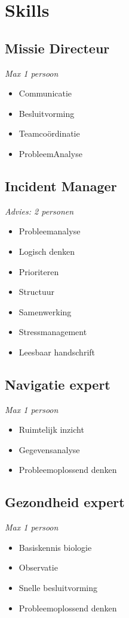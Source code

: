 \setcounter{page}{1}
\section{Skills}

\subsection{Missie Directeur}
\textit{Max 1 persoon}
\begin{itemize}
    \item Communicatie
    \item Besluitvorming
    \item Teamcoördinatie
    \item ProbleemAnalyse
\end{itemize}

\subsection{Incident Manager}
\textit{Advies: 2 personen}
\begin{itemize}
    \item Probleemanalyse
    \item Logisch denken
    \item Prioriteren
    \item Structuur
    \item Samenwerking
    \item Stressmanagement
    \item Leesbaar handschrift
\end{itemize}

\subsection{Navigatie expert}
\textit{Max 1 persoon}
\begin{itemize}
    \item Ruimtelijk inzicht
    \item Gegevensanalyse
    \item Probleemoplossend denken
\end{itemize}

\subsection{Gezondheid expert}
\textit{Max 1 persoon}
\begin{itemize}
    \item Basiskennis biologie
    \item Observatie
    \item Snelle besluitvorming
    \item Probleemoplossend denken
\end{itemize}

